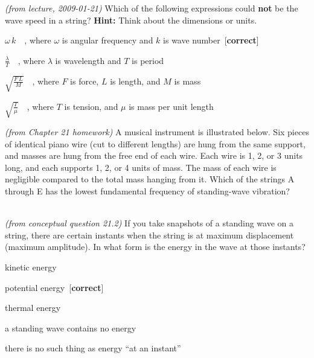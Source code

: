 \documentclass[12pt]{article}
\newcounter{answer}
\newenvironment{alist}{\begin{list}{(\Alph{answer})}{\usecounter{answer}}}%
  {\end{list}}
\newcommand{\explicitcorrect}[1]{[({#1})~\textbf{correct}]}
\newcommand{\correct}{~[\textbf{correct}]}
\newcommand{\source}[1]{\textsl{#1}}
\renewcommand{\emph}[1]{\textbf{#1}}
\begin{document}
\raggedright
\begin{enumerate}

\item \source{(from lecture, 2009-01-21)} Which of the following
  expressions could \emph{not} be the wave speed in a string?
  \emph{Hint:} Think about the dimensions or units.\begin{alist}
    \item $\displaystyle\omega\,k\quad$, where $\omega$ is angular
      frequency and $k$ is wave number\correct
    \item $\displaystyle\frac{\lambda}{T}\quad$, where $\lambda$ is
      wavelength and $T$ is period
    \item $\displaystyle\sqrt{\frac{F\,L}{M}}\quad$, where $F$ is force,
      $L$ is length, and $M$ is mass
    \item $\displaystyle\sqrt{\frac{T}{\mu}}\quad$, where $T$ is tension,
      and $\mu$ is mass per unit length
  \end{alist}

\item \source{(from Chapter 21 homework)} A musical instrument is
  illustrated below. Six pieces of identical piano wire (cut to
  different lengths) are hung from the same support, and masses are
  hung from the free end of each wire. Each wire is 1, 2, or 3 units
  long, and each supports 1, 2, or 4 units of mass. The mass of each
  wire is negligible compared to the total mass hanging from it.
  Which of the strings A through E has the lowest fundamental
  frequency of standing-wave
  vibration?\\ \\
  \explicitcorrect{D}

\item \source{(from conceptual question 21.2)} If you take snapshots of
  a standing wave on a string, there are certain instants when the
  string is at maximum displacement (maximum amplitude).  In what form
  is the energy in the wave at those instants?\begin{alist}
    \item kinetic energy
    \item potential energy\correct
    \item thermal energy
    \item a standing wave contains no energy
    \item there is no such thing as energy ``at an instant''
  \end{alist}


\end{enumerate}
\end{document}
